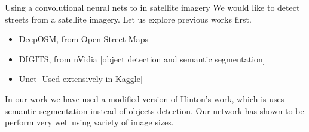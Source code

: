 \documentclass{beamer}
\begin{document}
\begin{frame}{Using a convolutional neural nets to in satellite imagery}
  We would like to detect streets from a satellite imagery.  Let us explore
  previous works first.

  \begin{itemize}
  \item DeepOSM, from Open Street Maps
  \item DIGITS, from nVidia [object detection and semantic segmentation]
  \item Unet [Used extensively in Kaggle]
    
  \end{itemize}
In our work we have used a modified version of Hinton's work, which is uses
semantic segmentation instead of objects detection. Our network has shown to be
perform very well using variety of image sizes.
\end{frame}
\end{document}

